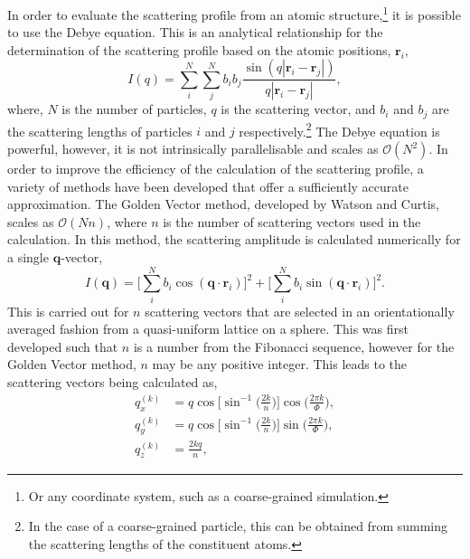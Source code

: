 In order to evaluate the scattering profile from an atomic structure,\footnote{Or any coordinate system, such as a coarse-grained simulation.} it is possible to use the Debye equation.\autocite{debye_zerstreuung_1915}
This is an analytical relationship for the determination of the scattering profile based on the atomic positions, $\mathbf{r}_i$,
%
\begin{equation}
    I(q) = \sum_{i}^{N}\sum_{j}^{N} b_ib_j\frac{\sin{(q|\mathbf{r}_i-\mathbf{r}_j|)}}{q|\mathbf{r}_i-\mathbf{r}_j|},
\end{equation}
%
where, $N$ is the number of particles, $q$ is the scattering vector, and $b_i$ and $b_j$ are the scattering lengths of particles $i$ and $j$ respectively.\footnote{In the case of a coarse-grained particle, this can be obtained from summing the scattering lengths of the constituent atoms.}
The Debye equation is powerful, however, it is not intrinsically parallelisable and scales as $\mathcal{O}(N^2)$.
In order to improve the efficiency of the calculation of the scattering profile, a variety of methods have been developed that offer a sufficiently accurate approximation.\autocite{svergun_solution_1994,watson_rapid_2013}
The Golden Vector method, developed by Watson and Curtis,\autocite{watson_rapid_2013} scales as $\mathcal{O}(Nn)$, where $n$ is the number of scattering vectors used in the calculation.
In this method, the scattering amplitude is calculated numerically for a single $\mathbf{q}$-vector,
%
\begin{equation}
    I(\mathbf{q}) = \Bigg[\sum_{i}^{N}b_i\cos{(\mathbf{q}\cdot\mathbf{r}_i)}\Bigg]^2 + \Bigg[\sum_{i}^{N}b_i\sin{(\mathbf{q}\cdot\mathbf{r}_i)}\Bigg]^2.
\end{equation}
%
This is carried out for $n$ scattering vectors that are selected in an orientationally averaged fashion from a quasi-uniform lattice on a sphere.
This was first developed such that $n$ is a number from the Fibonacci sequence,\autocite{svergun_solution_1994} however for the Golden Vector method, $n$ may be any positive integer.
This leads to the scattering vectors being calculated as,
%
\begin{equation}
    \begin{aligned}
        q_x^{(k)} & = q\cos\Bigg[\sin^{-1}\bigg(\frac{2k}{n}\bigg)\Bigg]\cos\bigg(\frac{2\pi k}{\Phi}\bigg), \\
        q_y^{(k)} & = q\cos\Bigg[\sin^{-1}\bigg(\frac{2k}{n}\bigg)\Bigg]\sin\bigg(\frac{2\pi k}{\Phi}\bigg), \\
        q_z^{(k)} & = \frac{2 k q}{n},
    \end{aligned}
\end{equation}
